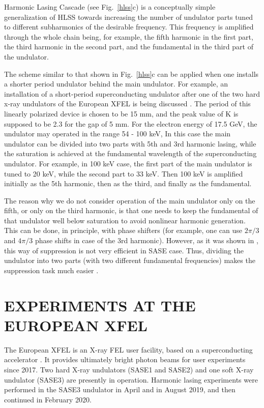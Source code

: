 \documentclass[aps,prl,preprint,groupedaddress,preprintnumbers]{revtex4}
\begin{document}
Harmonic Lasing Cascade (see Fig.~\ref{hlss}c) is a conceptually simple generalization of HLSS towards increasing the number of undulator parts tuned to different subharmonics of the desirable frequency. This frequency is amplified through the whole chain being, for example, the fifth harmonic in the first part, the third harmonic in the second part, and the fundamental in the third part of the undulator. 

The scheme similar to that shown in Fig.~\ref{hlss}c can be applied when one installs a shorter period undulator behind the main undulator. For example, an installation of a short-period superconducting undulator after one of the two hard x-ray undulators of the European XFEL is being discussed \cite{sara}. The period of this linearly polarized device is chosen to be 15 mm, and the peak value of K is supposed to be 2.3 for the gap of 5 mm. For the electron energy of 17.5 GeV, the undulator may operated in the range 54  - 100 keV, 
In this case the main undulator can be divided into two parts with 5th and 3rd harmonic lasing, while the saturation is achieved at the fundamental wavelength of the superconducting undulator. For example, in 100 keV case, the first part of the main undulator is tuned to 20 keV, while the second part to 33 keV. Then 100 keV is amplified initially as the 5th harmonic, then as the third, and finally as the fundamental. 

The reason why we do not consider operation of the main undulator only on the fifth, or only on the third harmonic, is that one needs to keep the fundamental of that undulator well below saturation to avoid nonlinear harmonic generation. This can be done, in principle, with phase shifters \cite{mcneil} (for example, one can use $2\pi/3$ and $4\pi/3$ phase shifts in case of the 3rd harmonic). However, as it was shown in \cite{sy-harm,fl-harm-las}, this way of suppression is not very efficient in SASE case. Thus, dividing the undulator into two parts (with two different fundamental frequencies) makes the suppression task much easier \cite{cw, penn}. 



\section{EXPERIMENTS AT THE EUROPEAN XFEL}


The European XFEL is an X-ray FEL user facility, based on a superconducting accelerator \cite{winni-xfel}. It
provides ultimately bright photon beams for user
experiments since 2017. Two hard X-ray undulators (SASE1 and SASE2) and one soft X-ray undulator (SASE3) are
presently in operation. Harmonic lasing experiments were performed in the SASE3 undulator
in April and in August 2019, and then continued in February 2020.
\end{document}
